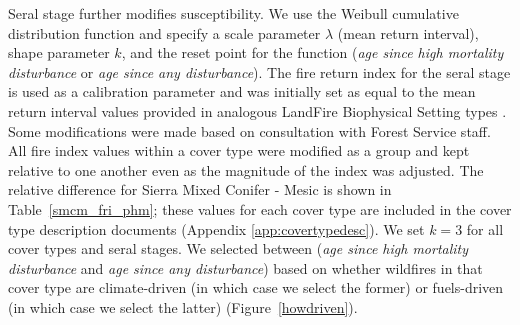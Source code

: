 \begin{itemize}
Seral stage further modifies susceptibility. We use the Weibull cumulative distribution function and specify a scale parameter $\lambda$ (mean return interval), shape parameter $k$, and the reset point for the function (\emph{age since high mortality disturbance} or \emph{age since any disturbance}). The fire return index for the seral stage is used as a calibration parameter and was initially set as equal to the mean return interval values provided in analogous LandFire Biophysical Setting types \citep{Landfire2007}. Some modifications were made based on consultation with Forest Service staff. All fire index values within a cover type were modified as a group and kept relative to one another even as the magnitude of the index was adjusted. The relative difference for Sierra Mixed Conifer - Mesic is shown in Table~\ref{smcm_fri_phm}; these values for each cover type are included in the cover type description documents (Appendix \ref{app:covertypedesc}). We set $k=3$ for all cover types and seral stages. We selected between (\emph{age since high mortality disturbance} and \emph{age since any disturbance}) based on whether wildfires in that cover type are climate-driven (in which case we select the former) or fuels-driven (in which case we select the latter) (Figure~\ref{howdriven}).


\end{itemize}
